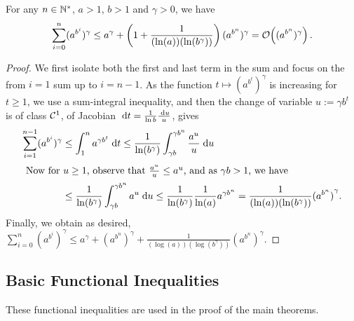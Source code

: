 \documentclass[12pt]{colt2018} %
\begin{document}
\begin{lemma}\label{lem:DoubleExpSumIneq}
    For any $n \in \mathbb{N}^*$, $a > 1$, $b > 1$ and $\gamma > 0$,
    we have
    \begin{equation}
        \sum_{i=0}^{n} (a^{b^i})^{\gamma} \leq
        a^{\gamma} + \left(1 + \frac{1}{(\ln(a)) (\ln(b^{\gamma}))}\right)
        (a^{b^n})^{\gamma}
        = \mathop{}\mathopen{}\mathcal{O}\mathopen{}\left((a^{b^n})^{\gamma}\right).
    \end{equation}
\end{lemma}
\begin{proof}\label{proof:DoubleExpSumIneq}
    We first isolate both the first and last term in the sum and focus on the from $i=1$ sum up to $i=n-1$.
    As the function $t \mapsto (a^{b^t})^{\gamma}$ is increasing for $t \geq 1$,
    we use a sum-integral inequality,
    and then the change of variable $u := \gamma b^t$ is of class $\mathcal{C}^1$,
    of Jacobian $\;\mathrm{d}t = \frac{1}{\ln b} \frac{\;\mathrm{d}u}{u}$,
    gives
    \begin{align*}
        \sum_{i=1}^{n-1} (a^{b^i})^{\gamma}
        &\leq \int_{1}^{n} a^{\gamma b^t} \;\mathrm{d}t
        \leq \frac{1}{\ln(b^{\gamma})} \int_{\gamma b}^{\gamma b^n} \frac{a^{u}}{u} \;\mathrm{d}u \\
        \intertext{
            Now for $u\geq1$, observe that $\frac{a^{u}}{u} \leq a^{u}$,
            and as $\gamma b > 1$, we have
        }
        &\leq \frac{1}{\ln(b^{\gamma})} \int_{\gamma b}^{\gamma b^n} a^{u} \;\mathrm{d}u
        \leq \frac{1}{\ln(b^{\gamma})} \frac{1}{\ln(a)} a^{\gamma b^n}
        = \frac{1}{(\ln(a)) (\ln(b^{\gamma}))} {(a^{b^n})}^{\gamma}.
    \end{align*}
    Finally, we obtain as desired,
    $\sum\limits_{i=0}^{n} (a^{b^i})^{\gamma} \leq
    a^{\gamma} + (a^{b^n})^{\gamma} + \frac{1}{(\log(a)) (\log(b^{\gamma}))} {(a^{b^n})}^{\gamma}$.
\end{proof}


\subsection{Basic Functional Inequalities}

These functional inequalities are used in the proof of the main theorems.

\end{document}
